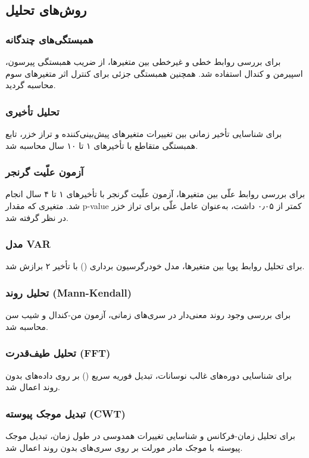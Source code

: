 \documentclass[12pt,a4paper]{article}
\begin{document}
\subsection{روش‌های تحلیل}
\subsubsection{همبستگی‌های چندگانه}
برای بررسی روابط خطی و غیرخطی بین متغیرها، از ضریب همبستگی پیرسون، اسپیرمن و کندال استفاده شد. همچنین همبستگی جزئی برای کنترل اثر متغیرهای سوم محاسبه گردید.

\subsubsection{تحلیل تأخیری}
برای شناسایی تأخیر زمانی بین تغییرات متغیرهای پیش‌بینی‌کننده و تراز خزر، تابع همبستگی متقاطع با تأخیرهای ۱ تا ۱۰ سال محاسبه شد.

\subsubsection{آزمون علّیت گرنجر}
برای بررسی روابط علّی بین متغیرها، آزمون علّیت گرنجر با تأخیرهای ۱ تا ۴ سال انجام شد. متغیری که مقدار p-value کمتر از ۰٫۰۵ داشت، به‌عنوان عامل علّی برای تراز خزر در نظر گرفته شد.

\subsubsection{مدل VAR}
برای تحلیل روابط پویا بین متغیرها، مدل خودرگرسیون برداری () با تأخیر ۲ برازش شد.

\subsubsection{تحلیل روند (Mann-Kendall)}
برای بررسی وجود روند معنی‌دار در سری‌های زمانی، آزمون من-کندال و شیب سن محاسبه شد.

\subsubsection{تحلیل طیف‌قدرت (FFT)}
برای شناسایی دوره‌های غالب نوسانات، تبدیل فوریه سریع () بر روی داده‌های بدون روند اعمال شد.

\subsubsection{تبدیل موجک پیوسته (CWT)}
برای تحلیل زمان-فرکانس و شناسایی تغییرات همدوسی در طول زمان، تبدیل موجک پیوسته با موجک مادر مورلت بر روی سری‌های بدون روند اعمال شد.
\end{document}
